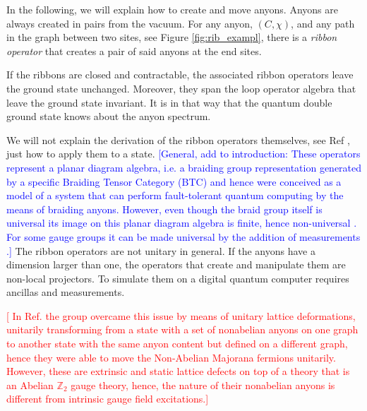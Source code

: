 \documentclass[two column]{article}
\newcommand{\caro}[1]{\textcolor{red}{[#1]}}
\newcommand{\jovan}[1]{\textcolor{blue}{[#1]}}
\begin{document}
In the following, we will explain how to create and move anyons. Anyons are always created in pairs from the vacuum. 
%
%
%
For any anyon, $(C, \chi)$, and any path in the graph between two sites, see Figure \ref{fig:rib_exampl}, there is a \emph{ribbon operator} that creates a pair of said anyons at the end sites. 

If the ribbons are closed and contractable, the associated ribbon operators leave the ground state unchanged. Moreover, they span the loop operator algebra that leave the ground state invariant. It is in that way that the quantum double ground state knows about the anyon spectrum.

We will not explain the derivation of the ribbon operators themselves, see Ref \cite{Kitaev_2003,cui2018topological}, just how to apply them to a state.
%
\jovan{General, add to introduction: These operators represent a planar diagram algebra, i.e. a braiding group representation generated by a specific Braiding Tensor Category (BTC) and hence were conceived as a model of a system that can perform fault-tolerant quantum computing by the means of braiding anyons.
However, even though the braid group itself is universal its image on this planar diagram algebra is finite, hence non-universal \cite{cui2018topological}. For some gauge groups it can be made universal by the addition of measurements \cite{Cui_2015}.}
%
The ribbon operators are not unitary in general. If the anyons have a dimension larger than one, the operators that create and manipulate them are non-local projectors. To simulate them on a digital quantum computer requires ancillas and measurements. 

\caro{%
In Ref. \cite{andersen2022observation} the group overcame this issue by means of unitary lattice deformations, unitarily transforming from a state with a set of nonabelian anyons on one graph to another state with the same anyon content but defined on a different graph, hence they were able to move the Non-Abelian Majorana fermions unitarily. However, these are extrinsic and static lattice defects on top of a theory that is an Abelian $\mathbb Z_2$ gauge theory, hence, the nature of their nonabelian anyons is different from intrinsic gauge field excitations.}
\end{document}
